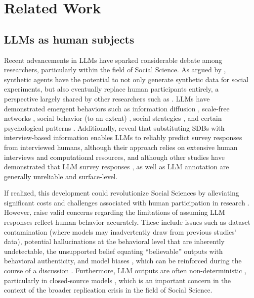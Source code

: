 %

\section{Related Work}


\subsection{LLMs as human subjects}
\label{ssec:related:human-llm}

Recent advancements in \acp{LLM} have sparked considerable debate among researchers, particularly within the field of Social Science. As argued by \citet{grossman_2023}, synthetic agents have the potential to not only generate synthetic data for social experiments, but also eventually replace human participants entirely, a perspective largely shared by other researchers such as \citet{tornberg_2024, argyle2023}. \acp{LLM} have demonstrated emergent behaviors such as information diffusion \cite{Park2023GenerativeAI}, scale-free networks \cite{demarzo_2023}, social behavior (to an extent) \cite{leng_2024}, social strategies \cite{abdelnabi_negotiations}, and certain psychological patterns \cite{abramski_2023}. Additionally, \citet{park2024generativeagentsimulations1000} reveal that substituting \acp{SDB} with interview-based information enables \acp{LLM} to reliably predict survey responses from interviewed humans, although their approach relies on extensive human interviews and computational resources, and although other studies have demonstrated that \ac{LLM} survey responses \cite{jansen_2023, bisbee_2023, neumann_2025}, as well as \ac{LLM} annotation \cite{Gligoric2024CanUL} are generally unreliable and surface-level. 

If realized, this development could revolutionize Social Sciences by alleviating significant costs and challenges associated with human participation in research \cite{rossi_2024, shapiro2019polling}. However, \citet{rossi_2024} raise valid concerns regarding the limitations of assuming \ac{LLM} responses reflect human behavior accurately. These include issues such as dataset contamination (where models may inadvertently draw from previous studies' data), potential hallucinations at the behavioral level that are inherently undetectable, the unsupported belief equating “believable” outputs with behavioral authenticity, and model biases \cite{anthis_2025, hewitt2024predicting}, which can be reinforced during the course of a discussion \cite{Taubenfeld2024SystematicBI}. Furthermore, \ac{LLM} outputs are often non-deterministic \cite{rossi_2024}, particularly in closed-source models \cite{bisbee_2023}, which is an important concern in the context of the broader replication crisis in the field of Social Science.



